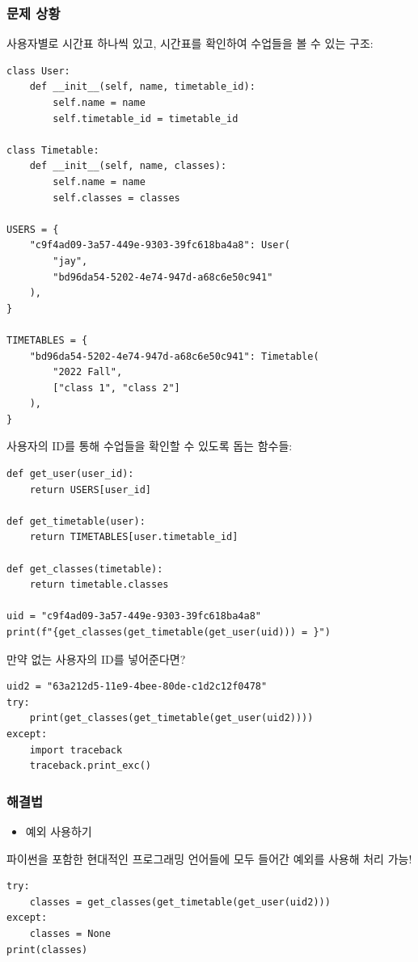 \documentclass[a4paper,11pt]{article}
\begin{document}
\subsubsection{문제 상황}
\label{sec:orgf1ff9ef}
사용자별로 시간표 하나씩 있고, 시간표를 확인하여 수업들을 볼 수 있는 구조:
\begin{verbatim}
class User:
    def __init__(self, name, timetable_id):
        self.name = name
        self.timetable_id = timetable_id

class Timetable:
    def __init__(self, name, classes):
        self.name = name
        self.classes = classes

USERS = {
    "c9f4ad09-3a57-449e-9303-39fc618ba4a8": User(
        "jay",
        "bd96da54-5202-4e74-947d-a68c6e50c941"
    ),
}

TIMETABLES = {
    "bd96da54-5202-4e74-947d-a68c6e50c941": Timetable(
        "2022 Fall",
        ["class 1", "class 2"]
    ),
}
\end{verbatim}

사용자의 ID를 통해 수업들을 확인할 수 있도록 돕는 함수들:
\begin{verbatim}
def get_user(user_id):
    return USERS[user_id]

def get_timetable(user):
    return TIMETABLES[user.timetable_id]

def get_classes(timetable):
    return timetable.classes

uid = "c9f4ad09-3a57-449e-9303-39fc618ba4a8"
print(f"{get_classes(get_timetable(get_user(uid))) = }")
\end{verbatim}

만약 없는 사용자의 ID를 넣어준다면?
\begin{verbatim}
uid2 = "63a212d5-11e9-4bee-80de-c1d2c12f0478"
try:
    print(get_classes(get_timetable(get_user(uid2))))
except:
    import traceback
    traceback.print_exc()
\end{verbatim}

\subsubsection{해결법}
\label{sec:orga91bd9d}
\begin{itemize}
\item 예외 사용하기
\end{itemize}
파이썬을 포함한 현대적인 프로그래밍 언어들에 모두 들어간 예외를 사용해 처리 가능!
\begin{verbatim}
try:
    classes = get_classes(get_timetable(get_user(uid2)))
except:
    classes = None
print(classes)
\end{verbatim}
\end{document}
